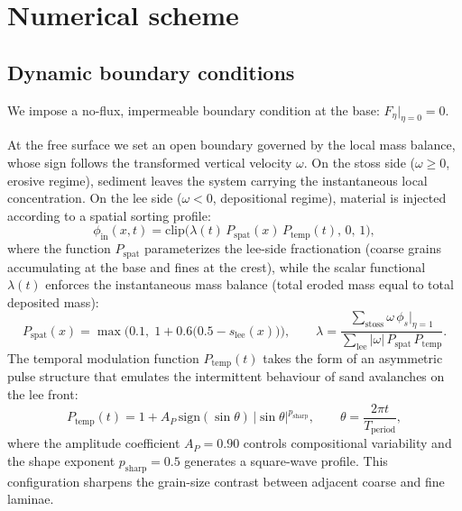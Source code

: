 \documentclass[lineno]{JFM-FLM_Au}
\begin{document}
\section{Numerical scheme}
\label{Sec:mathematical}

\subsection{Dynamic boundary conditions}
\label{sec:bc}

We impose a no-flux, impermeable boundary condition at the base: $F_\eta|_{\eta=0} = 0$.

At the free surface we set an open boundary governed by the local mass balance, whose sign follows the transformed vertical velocity $\omega$. On the stoss side ($\omega \geq 0$, erosive regime), sediment leaves the system carrying the instantaneous local concentration. On the lee side ($\omega < 0$, depositional regime), material is injected according to a spatial sorting profile:
\begin{equation}
    \phi_{\mathrm{in}}(x,t) = \mathrm{clip}\big(\lambda(t)\, P_{\mathrm{spat}}(x)\, P_{\mathrm{temp}}(t),\, 0,\, 1\big),
    \label{eq:phi_in}
\end{equation}
where the function $P_{\mathrm{spat}}$ parameterizes the lee-side fractionation (coarse grains accumulating at the base and fines at the crest), while the scalar functional $\lambda(t)$ enforces the instantaneous mass balance (total eroded mass equal to total deposited mass):
\begin{equation}
    P_{\mathrm{spat}}(x) = \max\!\Big(0.1,\; 1 + 0.6\big(0.5 - s_{\mathrm{lee}}(x)\big)\Big), \qquad
    \lambda = \frac{\sum_{\mathrm{stoss}} \omega\, \phi_s|_{\eta=1}}{\sum_{\mathrm{lee}} |\omega|\, P_{\mathrm{spat}}\, P_{\mathrm{temp}}}.
    \label{eq:Pspat_lambda}
\end{equation}
The temporal modulation function $P_{\mathrm{temp}}(t)$ takes the form of an asymmetric pulse structure that emulates the intermittent behaviour of sand avalanches on the lee front:
\begin{equation}
    P_{\mathrm{temp}}(t) = 1 + A_P\, \mathrm{sign}(\sin\theta)\, |\sin\theta|^{p_{\mathrm{sharp}}}, \qquad
    \theta = \frac{2\pi t}{T_{\mathrm{period}}},
    \label{eq:Ptemp}
\end{equation}
where the amplitude coefficient $A_P = 0.90$ controls compositional variability and the shape exponent $p_{\mathrm{sharp}} = 0.5$ generates a square-wave profile. This configuration sharpens the grain-size contrast between adjacent coarse and fine laminae.
\end{document}
